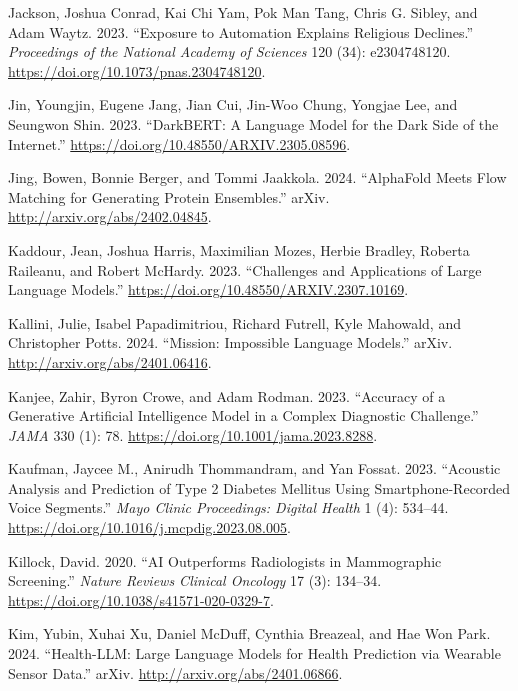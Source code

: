 \documentclass[
  Letterpaper,
]{scrbook}
\newlength{\cslhangindent}
\newenvironment{CSLReferences}[2] %
 {\begin{list}{}{%
  \setlength{\itemindent}{0pt}
  \setlength{\leftmargin}{0pt}
  \setlength{\parsep}{0pt}
  \ifodd #1
   \setlength{\leftmargin}{\cslhangindent}
   \setlength{\itemindent}{-1\cslhangindent}
  \fi
  \setlength{\itemsep}{#2\baselineskip}}}
 {\end{list}}
\begin{document}
\begin{CSLReferences}{1}{0}
Jackson, Joshua Conrad, Kai Chi Yam, Pok Man Tang, Chris G. Sibley, and
Adam Waytz. 2023. {``Exposure to Automation Explains Religious
Declines.''} \emph{Proceedings of the National Academy of Sciences} 120
(34): e2304748120. \url{https://doi.org/10.1073/pnas.2304748120}.

Jin, Youngjin, Eugene Jang, Jian Cui, Jin-Woo Chung, Yongjae Lee, and
Seungwon Shin. 2023. {``{DarkBERT}: {A} {Language} {Model} for the
{Dark} {Side} of the {Internet}.''}
\url{https://doi.org/10.48550/ARXIV.2305.08596}.

Jing, Bowen, Bonnie Berger, and Tommi Jaakkola. 2024. {``{AlphaFold}
{Meets} {Flow} {Matching} for {Generating} {Protein} {Ensembles}.''}
arXiv. \url{http://arxiv.org/abs/2402.04845}.

Kaddour, Jean, Joshua Harris, Maximilian Mozes, Herbie Bradley, Roberta
Raileanu, and Robert McHardy. 2023. {``Challenges and {Applications} of
{Large} {Language} {Models}.''}
\url{https://doi.org/10.48550/ARXIV.2307.10169}.

Kallini, Julie, Isabel Papadimitriou, Richard Futrell, Kyle Mahowald,
and Christopher Potts. 2024. {``Mission: {Impossible} {Language}
{Models}.''} arXiv. \url{http://arxiv.org/abs/2401.06416}.

Kanjee, Zahir, Byron Crowe, and Adam Rodman. 2023. {``Accuracy of a
{Generative} {Artificial} {Intelligence} {Model} in a {Complex}
{Diagnostic} {Challenge}.''} \emph{JAMA} 330 (1): 78.
\url{https://doi.org/10.1001/jama.2023.8288}.

Kaufman, Jaycee M., Anirudh Thommandram, and Yan Fossat. 2023.
{``Acoustic {Analysis} and {Prediction} of {Type} 2 {Diabetes}
{Mellitus} {Using} {Smartphone}-{Recorded} {Voice} {Segments}.''}
\emph{Mayo Clinic Proceedings: Digital Health} 1 (4): 534--44.
\url{https://doi.org/10.1016/j.mcpdig.2023.08.005}.

Killock, David. 2020. {``{AI} Outperforms Radiologists in Mammographic
Screening.''} \emph{Nature Reviews Clinical Oncology} 17 (3): 134--34.
\url{https://doi.org/10.1038/s41571-020-0329-7}.

Kim, Yubin, Xuhai Xu, Daniel McDuff, Cynthia Breazeal, and Hae Won Park.
2024. {``Health-{LLM}: {Large} {Language} {Models} for {Health}
{Prediction} via {Wearable} {Sensor} {Data}.''} arXiv.
\url{http://arxiv.org/abs/2401.06866}.


\end{CSLReferences}
\end{document}
